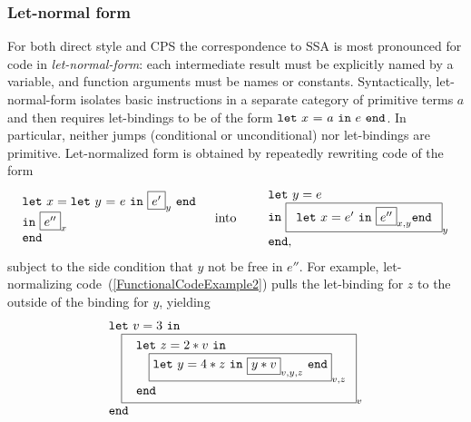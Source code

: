 
\subsubsection{Let-normal form}
\label{section:Part1:Semantics:LetNormalForm}
For both direct style and CPS the correspondence to SSA is most
pronounced for code in \emph{let-normal-form}: each intermediate
result must be explicitly named by a variable, and function arguments
must be names or constants. Syntactically, let-normal-form isolates
basic instructions in a separate category of primitive terms $a$ and
then requires let-bindings to be of the form $\mathtt{let}\ {x}\ \mathtt{=}\ {a}\ \mathtt{in}\ {e}\ \mathtt{end}$.  In
particular, neither jumps (conditional or unconditional) nor
let-bindings are primitive. Let-normalized form is obtained by
repeatedly rewriting code of the form
\begin{eqnarray*}
 \begin{array}{l}
   \mathtt{let}\ x = \letin y {e} {\fbox{$e'$}_y}\\
   \mathtt{in}\ {\fbox{$e''$}_{x}}\\ 
   \mathtt{end}
  \end{array}
& \quad \textrm{into} \quad &
  \begin{array}{l}
    \mathtt{let}\ y = e\\
    \mathtt{in}\ \fbox{$\begin{array}{l}
                            \mathtt{let}\ x = {e'}\ 
                            \mathtt{in}\ {\fbox{$e''$}_{x,y}}
                            \mathtt{end}
                        \end{array}$}_y\\
    \mathtt{end,}
  \end{array}
\end{eqnarray*}
subject to the side condition that $y$ not be free in $e''$.
For example, let-normalizing code~(\ref{FunctionalCodeExample2}) pulls the
let-binding for $z$ to the outside of the binding for $y$, yielding
\begin{equation}
\label{FunctionalCodeExample4}
\begin{array}{l}
\mathtt{let}\ v = 3\ \mathtt{in}\\
\quad 
  {\fbox{
   $\begin{array}[t]{l} 
     \mathtt{let}\ z=2*v \ \mathtt{in}\\
     \quad {\fbox{$\mathtt{let}\ y = 4*z\ \mathtt{in}\ 
                 \fbox{$y*v$}_{v,y,z}\ \mathtt{end}$}_{v,z}}\\
     \mathtt{end}
   \end{array}$}_{v}}\\
\mathtt{end}
\end{array}
\end{equation}

